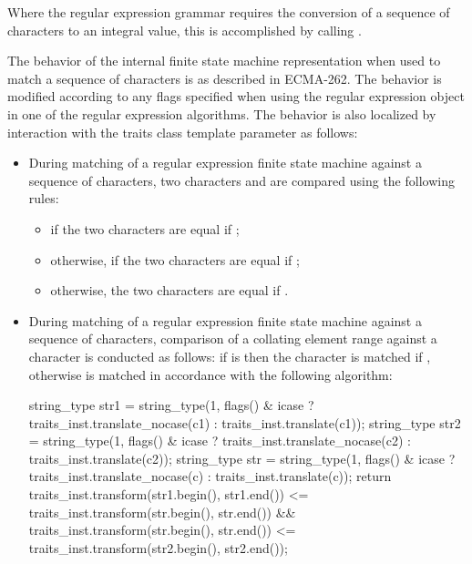 \pnum
Where the regular expression grammar requires the conversion of a sequence of characters
to an integral value, this is accomplished by calling .

\pnum
{}%
The behavior of the internal finite state machine representation when used to match a
sequence of characters is as described in ECMA-262.
The behavior is modified according
to any  flags specified when using the regular expression
object in one of the regular expression algorithms. The behavior is also
localized by interaction with the traits class template parameter as follows:
\begin{itemize}
\item During matching of a regular expression finite state machine
against a sequence of characters, two characters 
and  are compared using the following rules:
\begin{itemize}
\item if  the two characters are equal
if ;
\item otherwise, if  the
two characters are equal if
;
%
\item otherwise, the two characters are equal if .
\end{itemize}

\item During matching of a regular expression finite state machine
against a sequence of characters, comparison of a collating element
range  against a character  is
conducted as follows: if 
is  then the character  is matched if , otherwise  is matched in
accordance with the following algorithm:

\begin{codeblock}
string_type str1 = string_type(1,
  flags() & icase ?
    traits_inst.translate_nocase(c1) : traits_inst.translate(c1));
string_type str2 = string_type(1,
  flags() & icase ?
    traits_inst.translate_nocase(c2) : traits_inst.translate(c2));
string_type str = string_type(1,
  flags() & icase ?
    traits_inst.translate_nocase(c) : traits_inst.translate(c));
return traits_inst.transform(str1.begin(), str1.end())
      <= traits_inst.transform(str.begin(), str.end())
  && traits_inst.transform(str.begin(), str.end())
      <= traits_inst.transform(str2.begin(), str2.end());
\end{codeblock}


\end{itemize}
